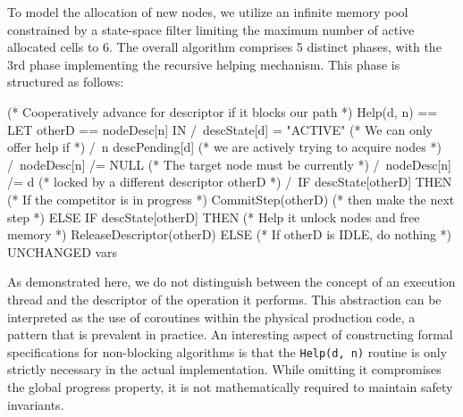 To model the allocation of new nodes, we utilize an infinite memory pool constrained by a state-space filter limiting the maximum number of active allocated cells to 6. The overall algorithm comprises 5 distinct phases, with the 3rd phase implementing the recursive helping mechanism. This phase is structured as follows:

\begin{tla}
(* Cooperatively advance for descriptor if it blocks our path *)
Help(d, n) == LET otherD == nodeDesc[n] IN
  /\ descState[d] = "ACTIVE" (* We can only offer help if *)
  /\ n \in descPending[d]    (* we are actively trying to acquire nodes *)
  /\ nodeDesc[n] /= NULL (* The target node must be currently *)
  /\ nodeDesc[n] /= d    (* locked by a different descriptor otherD *)
  /\ IF descState[otherD] 
     THEN (* If the competitor is in progress *)
        CommitStep(otherD) (* then make the next step *)
     ELSE IF descState[otherD] 
     THEN (* Help it unlock nodes and free memory *)
        ReleaseDescriptor(otherD)
     ELSE (* If otherD is IDLE, do nothing *)
        UNCHANGED vars
\end{tla}
\begin{tlatex}
\@x{}%
%
\@xx{}%
%
%
\@xx{}%
%
%
\@xx{}%
%
%
\@xx{}%
%
%
\@xx{}%
%
%
\@xx{}%
%
%
\@xx{}%
%
%
\@xx{}%
%
%
%
\@xx{}%
%
\end{tlatex}

As demonstrated here, we do not distinguish between the concept of an execution thread and the descriptor of the operation it performs. This abstraction can be interpreted as the use of coroutines within the physical production code, a pattern that is prevalent in practice. An interesting aspect of constructing formal specifications for non-blocking algorithms is that the \texttt{Help(d, n)} routine is only strictly necessary in the actual implementation. While omitting it compromises the global progress property, it is not mathematically required to maintain safety invariants.

